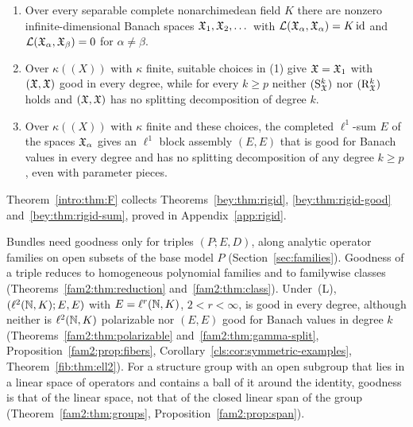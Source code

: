 \begin{introtheorem}\label{intro:thm:F}
\begin{enumerate}
\item Over every separable complete nonarchimedean field $K$ there are nonzero infinite-dimensional Banach spaces
$\mathfrak X_1,\mathfrak X_2,\dots$ with $\mathcal L(\mathfrak X_\alpha,\mathfrak X_\alpha)=K\,\mathrm{id}$ and $\mathcal L(\mathfrak X_\alpha,\mathfrak X_\beta)=0$ for $\alpha\ne\beta$.
\item Over $\kappa((X))$ with $\kappa$ finite, suitable choices in \textup{(1)} give $\mathfrak X=\mathfrak X_1$ with
$(\mathfrak X,\mathfrak X)$ good in every degree, while for every $k\ge p$ neither $(\mathrm S^k_{\mathfrak X})$ nor $(\mathrm R^k_{\mathfrak X})$
holds and $(\mathfrak X,\mathfrak X)$ has no splitting decomposition of degree $k$.
\item Over $\kappa((X))$ with $\kappa$ finite and these choices, the completed $\ell^1$-sum $E$ of the spaces $\mathfrak X_\alpha$
gives an $\ell^1$ block assembly $(E,E)$ that is good for Banach values in every degree and has no splitting
decomposition of any degree $k\ge p$, even with parameter pieces.
\end{enumerate}
\end{introtheorem}

Theorem~\ref{intro:thm:F} collects Theorems~\ref{bey:thm:rigid}, \ref{bey:thm:rigid-good} and~\ref{bey:thm:rigid-sum},
proved in Appendix~\ref{app:rigid}.

Bundles need goodness only for triples $(P;E,D)$, along analytic operator families on open subsets of the base model
$P$ (Section~\ref{sec:families}). Goodness of a triple reduces to homogeneous polynomial families and to familywise classes
(Theorems~\ref{fam2:thm:reduction} and~\ref{fam2:thm:class}). Under~\textup{(L)}, $(\ell^2(\mathbb N,K);E,E)$ with
$E=\ell^r(\mathbb N,K)$, $2<r<\infty$, is good in every degree, although neither is $\ell^2(\mathbb N,K)$ polarizable nor $(E,E)$
good for Banach values in degree $k$ (Theorems~\ref{fam2:thm:polarizable} and~\ref{fam2:thm:gamma-split},
Proposition~\ref{fam2:prop:fibers}, Corollary~\ref{cls:cor:symmetric-examples}, Theorem~\ref{fib:thm:ell2}). For a
structure group with an open subgroup that lies in a linear space of operators and contains a ball of it around the
identity, goodness is that of the linear space, not that of the closed linear span of the group
(Theorem~\ref{fam2:thm:groups}, Proposition~\ref{fam2:prop:span}).

